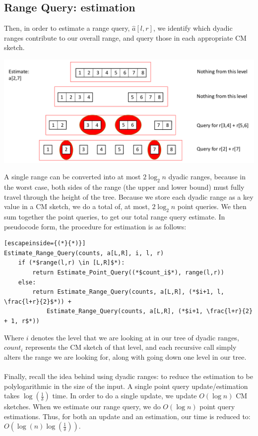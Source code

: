 \documentclass[11pt]{article}
\begin{document}
{\subsection{Range Query: estimation}
Then, in order to estimate a range query, $\hat a[l,r]$, we identify which dyadic ranges contribute to our overall range, and query those in each appropriate CM sketch.
\begin{center}\includegraphics[scale=0.3]{range_estimate.png}\end{center}
A single range can be converted into at most $2\log_2n$ dyadic ranges, because in the worst case, both sides of the range (the upper and lower bound)  must fully travel through the height of the tree. Because we store each dyadic range as a key value in a CM sketch, we do a total of, at most, $2\log_2n$ point queries. We then sum together the point queries, to get our total range query estimate. In pseudocode form, the procedure for estimation is as follows:
\begin{lstlisting}[escapeinside={(*}{*)}]
Estimate_Range_Query(counts, a[L,R], i, l, r) 
    if (*$range(l,r) \in [L,R]$*):
        return Estimate_Point_Query((*$count_i$*), range(l,r))
    else:
        return Estimate_Range_Query(counts, a[L,R], (*$i+1, l, \frac{l+r}{2}$*)) +
            Estimate_Range_Query(counts, a[L,R], (*$i+1, \frac{l+r}{2} + 1, r$*))
\end{lstlisting}
Where $i$ denotes the level that we are looking at in our tree of dyadic ranges, $count_i$ represents the CM sketch of that level, and each recursive call simply alters the range we are looking for, along with going down one level in our tree.\\\\
Finally, recall the idea behind using dyadic ranges: to reduce the estimation to be polylogarithmic in the size of the input. A single point query update/estimation takes $\log(\frac{1}{\delta})$ time. In order to do a single update, we update $O(\log n)$ CM sketches. When we estimate our range query, we do $O(\log n)$ point query estimations. Thus, for both an update and an estimation, our time is reduced to: $O(\log(n)\log(\frac{1}{\delta}))$.
}
\end{document}
